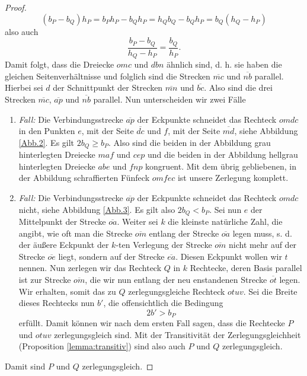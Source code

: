 \documentclass[11pt,titlepage]{article}
\theoremstyle{definition}
\theoremstyle{remark}
\begin{document}
\begin{proof}
		\[ (b_P-b_Q)h_P=b_P h_P-b_Q h_P=h_Qb_Q-b_Qh_P=b_Q(h_Q-h_P) \]
		also auch
		\[\frac{b_P-b_Q}{h_Q-h_P}=\frac{b_Q}{h_P}. \]
		Damit folgt, dass die Dreiecke $omc$ und $dbn$ ähnlich sind, d. h. 
		sie haben die gleichen Seitenverhältnisse und folglich sind die Strecken $\overline{mc}$ 
		und $\overline{nb}$ parallel. Hierbei sei $d$ der Schnittpunkt der Strecken $\overline{mn}$ und 
		$\overline{bc}$. Also sind die drei Strecken $\overline{mc}$, $\overline{ap}$ und $\overline{nb}$ 
		parallel. Nun unterscheiden wir zwei Fälle
		\begin{enumerate}
			\item \textsl{Fall:} Die Verbindungsstrecke $\overline{ap}$ der Eckpunkte schneidet das 
			Rechteck $omdc$ in den Punkten $e$, mit der Seite $\overline{dc}$ und $f$, mit der Seite $\overline{md}$, siehe Abbildung \ref{Abb.2}. 
			Es gilt $2b_Q\geq b_P$.
			Also sind die beiden in der Abbildung grau hinterlegten Dreiecke $maf$ und $cep$ und die beiden 
			in der Abbildung hellgrau hinterlegten Dreiecke $abe$ und $fnp$ kongruent. Mit dem übrig gebliebenen, 
			in der Abbildung schraffierten Fünfeck $omfec$ ist unsere Zerlegung komplett.
			
			\item \textsl{Fall:} Die Verbindungsstrecke $\overline{ap}$ der Eckpunkte schneidet das 
			Rechteck $omdc$ nicht, siehe Abbildung \ref{Abb.3}. 
			Es gilt also $2b_Q<b_P$. Sei nun $e$ der Mittelpunkt der Strecke $\overline{oa}$. Weiter sei $k$ die 
			kleinste natürliche Zahl, die angibt, wie oft man die Strecke $\overline{om}$ entlang der Strecke $\overline{oa}$ 
			legen muss, s. d. der äußere Eckpunkt der $k$-ten Verlegung der Strecke 
			$\overline{om}$ nicht mehr auf der Strecke $\overline{oe}$ liegt, 
			sondern auf der Strecke $\overline{ea}$. Diesen Eckpunkt wollen 
			wir $t$ nennen. 
			Nun zerlegen wir das Rechteck $Q$ in $k$ Rechtecke, deren 
			Basis parallel ist zur Strecke $\overline{om}$, die wir nun entlang der neu enstandenen Strecke 
			$\overline{ot}$ legen. Wir erhalten, somit das zu $Q$ zerlegungsgleiche Rechteck $otuv$. 
			Sei die Breite dieses Rechtecks nun $b'$, die offensichtlich die Bedingung
			\[ 2b'>b_P \]
			erfüllt. Damit können wir nach dem ersten Fall sagen, dass die Rechtecke $P$ und $otuv$ 
			zerlegungsgleich sind. Mit der Transitivität der 
			Zerlegungsgleichheit (Proposition \ref{lemma:transitiv}) sind 
			also auch $P$ und $Q$ zerlegungsgleich.
		\end{enumerate}
		Damit sind $P$ und $Q$ zerlegungsgleich.
	\end{proof}
	
\end{document}
